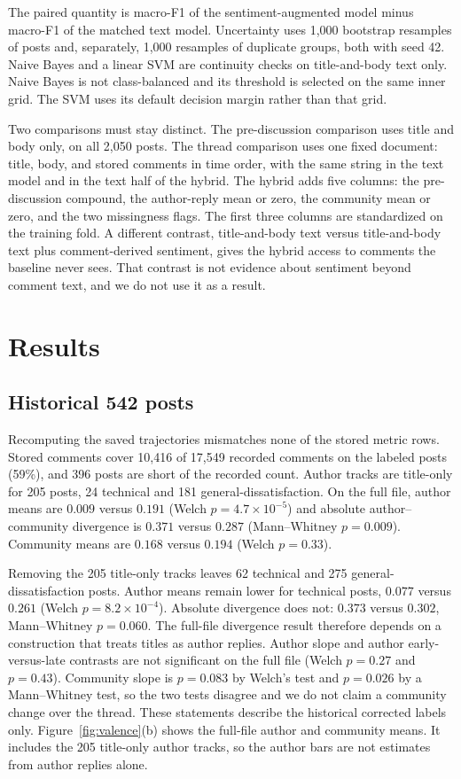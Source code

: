 \documentclass[conference,letterpaper]{IEEEtran}
\begin{document}
The paired quantity is macro-F1 of the sentiment-augmented model minus macro-F1 of the matched text model. Uncertainty uses 1,000 bootstrap resamples of posts and, separately, 1,000 resamples of duplicate groups, both with seed 42. Naive Bayes and a linear SVM are continuity checks on title-and-body text only. Naive Bayes is not class-balanced and its threshold is selected on the same inner grid. The SVM uses its default decision margin rather than that grid.

Two comparisons must stay distinct. The pre-discussion comparison uses title and body only, on all 2,050 posts. The thread comparison uses one fixed document: title, body, and stored comments in time order, with the same string in the text model and in the text half of the hybrid. The hybrid adds five columns: the pre-discussion compound, the author-reply mean or zero, the community mean or zero, and the two missingness flags. The first three columns are standardized on the training fold. A different contrast, title-and-body text versus title-and-body text plus comment-derived sentiment, gives the hybrid access to comments the baseline never sees. That contrast is not evidence about sentiment beyond comment text, and we do not use it as a result.

\section{Results}
\subsection{Historical 542 posts}
Recomputing the saved trajectories mismatches none of the stored metric rows. Stored comments cover 10,416 of 17,549 recorded comments on the labeled posts (59\%), and 396 posts are short of the recorded count. Author tracks are title-only for 205 posts, 24 technical and 181 general-dissatisfaction. On the full file, author means are $0.009$ versus $0.191$ (Welch $p=4.7\times10^{-5}$) and absolute author--community divergence is $0.371$ versus $0.287$ (Mann--Whitney $p=0.009$). Community means are $0.168$ versus $0.194$ (Welch $p=0.33$).

Removing the 205 title-only tracks leaves 62 technical and 275 general-dissatisfaction posts. Author means remain lower for technical posts, $0.077$ versus $0.261$ (Welch $p=8.2\times10^{-4}$). Absolute divergence does not: $0.373$ versus $0.302$, Mann--Whitney $p=0.060$. The full-file divergence result therefore depends on a construction that treats titles as author replies. Author slope and author early-versus-late contrasts are not significant on the full file (Welch $p=0.27$ and $p=0.43$). Community slope is $p=0.083$ by Welch's test and $p=0.026$ by a Mann--Whitney test, so the two tests disagree and we do not claim a community change over the thread. These statements describe the historical corrected labels only. Figure~\ref{fig:valence}(b) shows the full-file author and community means. It includes the 205 title-only author tracks, so the author bars are not estimates from author replies alone.
\end{document}
